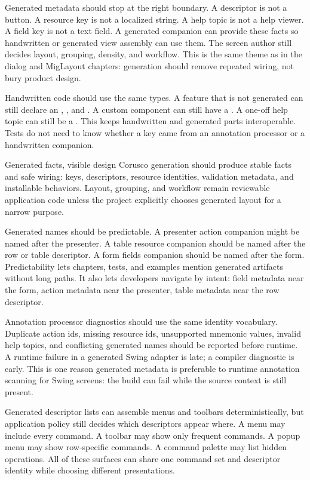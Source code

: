 Generated metadata should stop at the right boundary. A descriptor is not a
button. A resource key is not a localized string. A help topic is not a help
viewer. A field key is not a text field. A generated companion can provide
these facts so handwritten or generated view assembly can use them. The screen
author still decides layout, grouping, density, and workflow. This is the same
theme as in the dialog and MigLayout chapters: generation should remove
repeated wiring, not bury product design.

Handwritten code should use the same types. A feature that is not generated
can still declare an , , and
. A custom component can still have a
. A one-off help topic can still be a . This
keeps handwritten and generated parts interoperable. Tests do not need to know
whether a key came from an annotation processor or a handwritten companion.

\begin{coruscobox}{Generated facts, visible design}
Corusco generation should produce stable facts and safe wiring: keys,
descriptors, resource identities, validation metadata, and installable
behaviors. Layout, grouping, and workflow remain reviewable application code
unless the project explicitly chooses generated layout for a narrow purpose.
\end{coruscobox}

Generated names should be predictable. A presenter action companion might be
named after the presenter. A table resource companion should be named after the
row or table descriptor. A form fields companion should be named after the
form. Predictability lets chapters, tests, and examples mention generated
artifacts without long paths. It also lets developers navigate by intent:
field metadata near the form, action metadata near the presenter, table
metadata near the row descriptor.

Annotation processor diagnostics should use the same identity vocabulary.
Duplicate action ids, missing resource ids, unsupported mnemonic values,
invalid help topics, and conflicting generated names should be reported before
runtime. A runtime failure in a generated Swing adapter is late; a compiler
diagnostic is early. This is one reason generated metadata is preferable to
runtime annotation scanning for Swing screens: the build can fail while the
source context is still present.

Generated descriptor lists can assemble menus and toolbars deterministically,
but application policy still decides which descriptors appear where. A menu may
include every command. A toolbar may show only frequent commands. A popup menu
may show row-specific commands. A command palette may list hidden operations.
All of these surfaces can share one command set and descriptor identity while
choosing different presentations.

